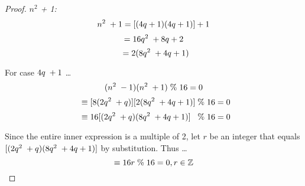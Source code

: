 \documentclass[12pt]{article}
\begin{document}
\begin{proof}
\textit{$n^2$ + 1:}
\begin{equation}
n^2 \hspace{.1cm} + 1 = [(4q + 1)(4q + 1)] + 1
\end{equation}
\begin{equation}
= 16q^2 \hspace{.1cm} + 8q + 2
\end{equation}
\begin{equation}
\hspace{.2cm}= 2(8q^2 \hspace{.1cm} + 4q + 1)
\end{equation}
\bigskip

For case $4q \hspace{.1cm} + 1$ \ldots
\begin{equation}
(n^2 \hspace{.1cm} -1)(n^2 \hspace{.1cm} + 1) \hspace{.1cm} \% \hspace{.1cm} 16 = 0
\end{equation}
\begin{equation}
\hspace{.2cm}\equiv [8(2q^2 \hspace{.1cm} + q)][2(8q^2 \hspace{.1cm} + 4q + 1)] \hspace{.1cm} \% \hspace{.1cm} 16 = 0
\end{equation}
\begin{equation}
\hspace{.2cm}\equiv 16[(2q^2 \hspace{.1cm} + q)(8q^2 \hspace{.1cm} + 4q + 1)] \hspace{.3cm} \% \hspace{.1cm} 16 = 0
\end{equation}
\bigskip

Since the entire inner expression is a multiple of 2, let $r$ be an integer that equals $[(2q^2 \hspace{.1cm} + q)(8q^2 \hspace{.1cm} + 4q + 1)]$ by substitution. Thus \ldots \\

\begin{equation}
\equiv 16r \hspace{.1cm} \% \hspace{.1cm} 16 = 0, r \in \mathbb{Z}
\end{equation}
\bigskip


\end{proof}
\end{document}
